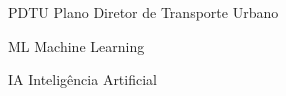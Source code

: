 \begin{siglas}
  \item[PDTU] Plano Diretor de Transporte Urbano
  \item[ML] Machine Learning 
  \item[IA] Inteligência Artificial
\end{siglas}